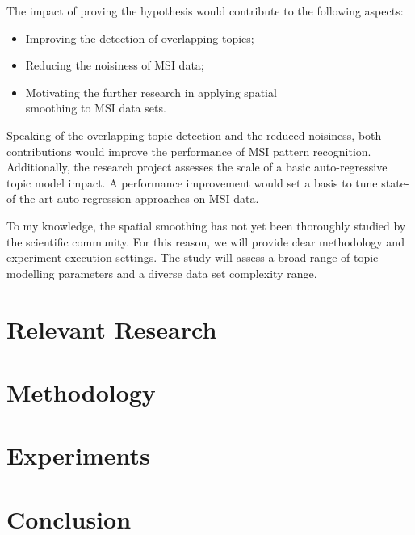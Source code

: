 \documentclass{mpaper}
\begin{document}
\par The impact of proving the hypothesis would contribute to the following aspects:
\begin{itemize}
	\item Improving the detection of overlapping topics;
	\item Reducing the noisiness of MSI data;
	\item Motivating the further research in applying spatial \\smoothing to MSI data sets.
\end{itemize} 
Speaking of the overlapping topic detection and the reduced noisiness, both contributions would improve the performance of MSI pattern recognition. Additionally, the research project assesses the scale of a basic auto-regressive topic model impact. A performance improvement would set a basis to tune state-of-the-art auto-regression approaches on MSI data.

\par To my knowledge, the spatial smoothing has not yet been thoroughly studied by the scientific community. For this reason, we will provide clear methodology and experiment execution settings. The study will assess a broad range of topic modelling parameters and a diverse data set complexity range. 

\section{Relevant Research}

\lipsum[1-3]

\section{Methodology}

\lipsum[1-3]

 \section{Experiments}

\lipsum[1-3]

\section{Conclusion}

\lipsum[1]



\end{document}
